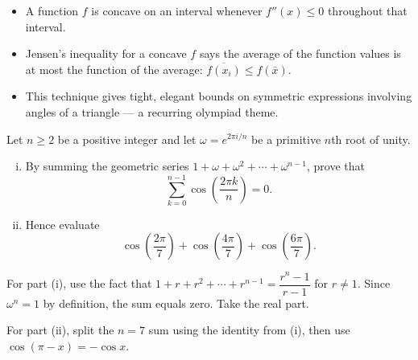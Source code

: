 \begin{takeaways}
\begin{itemize}[leftmargin=*]
  \item A function $f$ is concave on an interval whenever $f''(x) \le 0$ throughout that interval.
  \item Jensen's inequality for a concave $f$ says the average of the function values is at most
        the function of the average: $\overline{f(x_i)} \le f(\bar x)$.
  \item This technique gives tight, elegant bounds on symmetric expressions involving
        angles of a triangle — a recurring olympiad theme.
\end{itemize}
\end{takeaways}

\begin{problem}
Let $n \ge 2$ be a positive integer and let $\omega = e^{2\pi i/n}$ be a primitive $n$th
root of unity.
\begin{enumerate}[(i)]
  \item By summing the geometric series $1 + \omega + \omega^2 + \cdots + \omega^{n-1}$,
        prove that
        \[
        \sum_{k=0}^{n-1} \cos\!\left(\frac{2\pi k}{n}\right) = 0.
        \]
  \item Hence evaluate
        \[
        \cos\!\left(\frac{2\pi}{7}\right) + \cos\!\left(\frac{4\pi}{7}\right)
        + \cos\!\left(\frac{6\pi}{7}\right).
        \]
\end{enumerate}
\end{problem}

\begin{hintbox}
For part (i), use the fact that $1 + r + r^2 + \cdots + r^{n-1} = \dfrac{r^n - 1}{r - 1}$
for $r \ne 1$. Since $\omega^n = 1$ by definition, the sum equals zero. Take the real part.

For part (ii), split the $n=7$ sum using the identity from (i), then use $\cos(\pi - x) = -\cos x$.
\end{hintbox}

